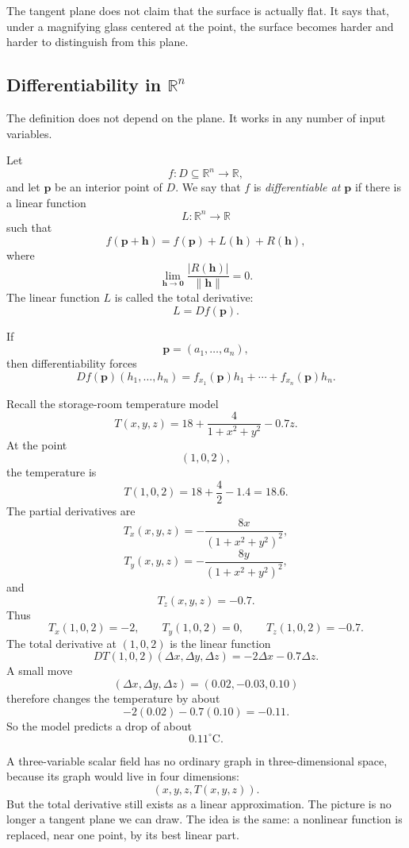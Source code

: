 The tangent plane does not claim that the surface is actually flat.  It says that, under a
magnifying glass centered at the point, the surface becomes harder and harder to
distinguish from this plane.

\subsection{Differentiability in \texorpdfstring{\(\mathbb R^n\)}{Rn}}

The definition does not depend on the plane.  It works in any number of input
variables.

\begin{definition}
Let
\[
    f:D\subseteq\mathbb R^n\to\mathbb R,
\]
and let \(\mathbf p\) be an interior point of \(D\).  We say that \(f\) is
\emph{differentiable at \(\mathbf p\)} if there is a linear function
\[
    L:\mathbb R^n\to\mathbb R
\]
such that
\[
\boxed{
    f(\mathbf p+\mathbf h)
    =
    f(\mathbf p)+L(\mathbf h)+R(\mathbf h),
}
\]
where
\[
\boxed{
    \lim_{\mathbf h\to\mathbf 0}
    \frac{|R(\mathbf h)|}{\|\mathbf h\|}=0.
}
\]
The linear function \(L\) is called the total derivative:
\[
    L=Df(\mathbf p).
\]
\end{definition}

If
\[
    \mathbf p=(a_1,\ldots,a_n),
\]
then differentiability forces
\[
\boxed{
    Df(\mathbf p)(h_1,\ldots,h_n)
    =
    f_{x_1}(\mathbf p)h_1+\cdots+f_{x_n}(\mathbf p)h_n.
}
\]

\begin{example}
Recall the storage-room temperature model
\[
    T(x,y,z)=18+\frac{4}{1+x^2+y^2}-0.7z.
\]
At the point
\[
    (1,0,2),
\]
the temperature is
\[
    T(1,0,2)=18+\frac{4}{2}-1.4=18.6.
\]
The partial derivatives are
\[
    T_x(x,y,z)= -\frac{8x}{(1+x^2+y^2)^2},
\]
\[
    T_y(x,y,z)= -\frac{8y}{(1+x^2+y^2)^2},
\]
and
\[
    T_z(x,y,z)=-0.7.
\]
Thus
\[
    T_x(1,0,2)=-2,
    \qquad
    T_y(1,0,2)=0,
    \qquad
    T_z(1,0,2)=-0.7.
\]
The total derivative at \((1,0,2)\) is the linear function
\[
    DT(1,0,2)(\Delta x,\Delta y,\Delta z)
    =
    -2\Delta x-0.7\Delta z.
\]
A small move
\[
    (\Delta x,\Delta y,\Delta z)=(0.02,-0.03,0.10)
\]
therefore changes the temperature by about
\[
    -2(0.02)-0.7(0.10)
    =
    -0.11.
\]
So the model predicts a drop of about
\[
    0.11^\circ\text{C}.
\]
\end{example}

A three-variable scalar field has no ordinary graph in three-dimensional space, because
its graph would live in four dimensions:
\[
    (x,y,z,T(x,y,z)).
\]
But the total derivative still exists as a linear approximation.  The picture is no longer
a tangent plane we can draw.  The idea is the same: a nonlinear function is replaced,
near one point, by its best linear part.

